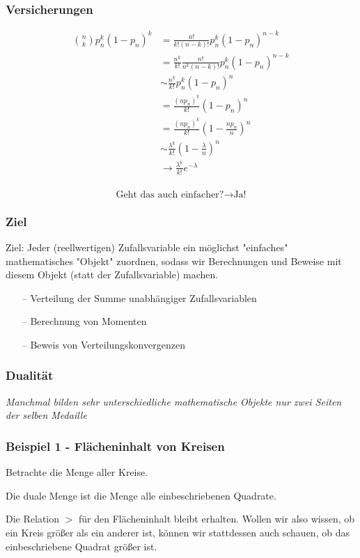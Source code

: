 \documentclass{beamer}
\begin{document}
\begin{frame}
\frametitle{Versicherungen}
{\footnotesize
  \begin{align*}
  {n \choose k} p_n^k(1-p_n)^k &= \frac{n!}{k!(n-k)!} p_n^k(1-p_n)^{n-k}\\
  &= \frac{n^k}{k!} \frac{n!}{n^k(n-k)!} p_n^k(1-p_n)^{n-k}\\
  &\sim \frac{n^k}{k!} p_n^k(1-p_n)^n\\
  &= \frac{(np_n)^k}{k!}(1-p_n)^n\\
  &= \frac{(np_n)^k}{k!}(1-\frac{np_n}{n})^n\\
  &\sim \frac{\lambda^k}{k!}(1-\frac{\lambda}{n})^n\\
  &\to \frac{\lambda^k}{k!}e^{-\lambda}\\
  \end{align*}
}%
\end{frame}

\begin{frame}
$$\text{Geht das auch einfacher?} \to \text{Ja!}$$
\end{frame}

\begin{frame}
\frametitle{Ziel}
Ziel: Jeder (reellwertigen) Zufallsvariable ein möglichst "einfaches" mathematisches "Objekt" zuordnen, sodass wir Berechnungen und Beweise mit diesem Objekt (statt der Zufallsvariable) machen.
\hfill \newline
\begin{itemize}
    \item[--] Verteilung der Summe unabhängiger Zufallsvariablen
    \item[--] Berechnung von Momenten
    \item[--] Beweis von Verteilungskonvergenzen
\end{itemize}
\end{frame}


\begin{frame}
\frametitle{Dualität}
\textit{Manchmal bilden sehr unterschiedliche mathematische Objekte nur zwei Seiten der selben Medaille}
\end{frame}

\begin{frame}
\frametitle{Beispiel 1 - Flächeninhalt von Kreisen}
Betrachte die Menge aller Kreise.

Die duale Menge ist die Menge alle einbeschriebenen Quadrate.

Die Relation $>$ für den Flächeninhalt bleibt erhalten. Wollen wir also wissen, ob ein Kreis größer als ein anderer ist, können wir stattdessen auch schauen, ob das einbeschriebene Quadrat größer ist.
\end{frame}
\end{document}
